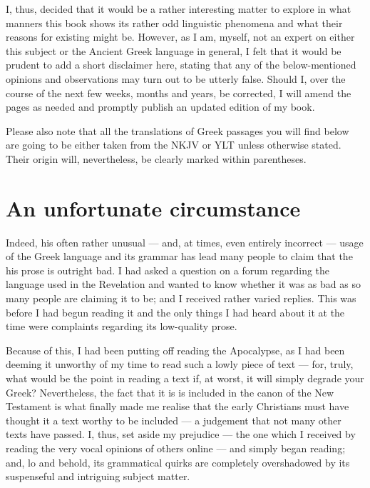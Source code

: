 I, thus, decided that it would be a rather interesting matter to explore in what manners this book shows its rather odd linguistic phenomena and what their reasons for existing might be. However, as I am, myself, not an expert on either this subject or the Ancient Greek language in general, I felt that it would be prudent to add a short disclaimer here, stating that any of the below-mentioned opinions and observations may turn out to be utterly false. Should I, over the course of the next few weeks, months and years, be corrected, I will amend the pages as needed and promptly publish an updated edition of my book. 

Please also note that all the translations of Greek passages you will find below are going to be either taken from the NKJV or YLT unless otherwise stated. Their origin will, nevertheless, be clearly marked within parentheses.

\section*{An unfortunate circumstance}
  
Indeed, his often rather unusual — and, at times, even entirely incorrect — usage of the Greek language and its grammar has lead many people to claim that the his prose is outright bad. I had asked a question on a forum regarding the language used in the Revelation and wanted to know whether it was as bad as so many people are claiming it to be; and I received rather varied replies. This was before I had begun reading it and the only things I had heard about it at the time were complaints regarding its low-quality prose.

Because of this, I had been putting off reading the Apocalypse, as I had been deeming it unworthy of my time to read such a lowly piece of text — for, truly, what would be the point in reading a text if, at worst, it will simply degrade your Greek? Nevertheless, the fact that it is is included in the canon of the New Testament is what finally made me realise that the early Christians must have thought it a text worthy to be included — a judgement that not many other texts have passed. I, thus, set aside my prejudice — the one which I received by reading the very vocal opinions of others online — and simply began reading; and, lo and behold, its grammatical quirks are completely overshadowed by its suspenseful and intriguing subject matter.

